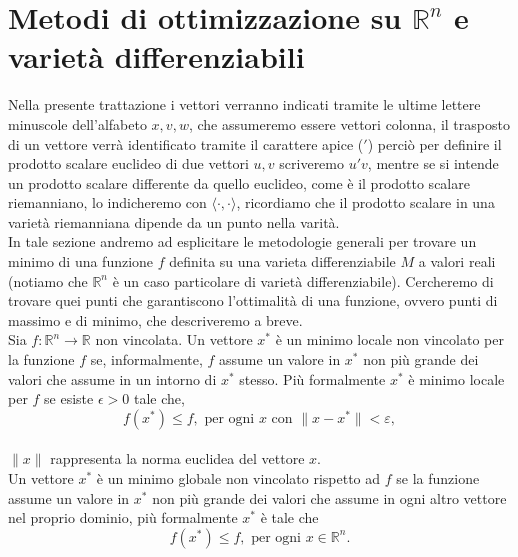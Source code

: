 \documentclass[a4paper, 12pt]{article}
\begin{document}
\section{Metodi di ottimizzazione su $\mathbb{R}^n$ e varietà differenziabili}
Nella presente trattazione i vettori verranno indicati tramite le ultime lettere minuscole dell'alfabeto $x, v, w$, che assumeremo essere vettori colonna, il trasposto di un vettore verrà identificato tramite il carattere apice ($'$) perciò per definire il prodotto scalare euclideo di due vettori $u, v$ scriveremo $u'v$, mentre se si intende  un prodotto scalare differente da quello euclideo, come è il prodotto scalare riemanniano, lo indicheremo con $\langle \cdot,\cdot \rangle$, ricordiamo che il prodotto scalare in una varietà riemanniana dipende da un punto nella varità.\\
In tale sezione andremo ad esplicitare le metodologie generali per trovare un minimo di una funzione $f$ definita su una varieta differenziabile $M$ a valori reali (notiamo che $\mathbb{R}^n$ è un caso particolare di varietà differenziabile). Cercheremo di trovare quei punti che garantiscono l'ottimalità di una funzione, ovvero punti di massimo e di minimo, che descriveremo a breve.\\
Sia $f: \mathbb{R} ^n \to \mathbb{R}$ non vincolata.
Un vettore $x^\ast$ è un minimo locale non vincolato per la funzione $f$ se, informalmente, $f$ assume un valore in $x^\ast$ non più grande dei valori che assume in un intorno di $x^\ast$ stesso. Più formalmente $x^\ast$ è minimo locale per $f$ se esiste $\epsilon > 0$ tale che,\\
\[f(x^\ast) \leq f, \mbox{ per ogni } x \mbox{ con } \parallel x - x^\ast \parallel < \varepsilon,\]\\
$\| x \|$ rappresenta la norma euclidea del vettore $x$.\\
Un vettore $x^\ast$ è un minimo globale non vincolato rispetto ad $f$ se la funzione assume un valore in $x^\ast$ non più grande dei valori che assume in ogni altro vettore nel proprio dominio, più formalmente $x^\ast$ è tale che\\
\[f(x^\ast) \leq f, \mbox{ per ogni } x \in \mathbb{R}^n.\]\\
\end{document}
